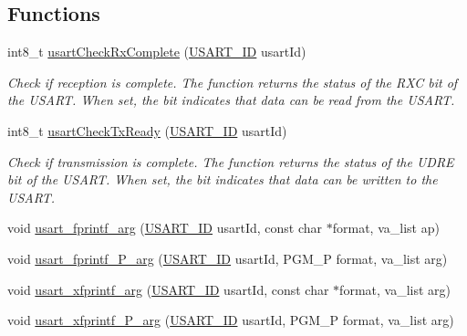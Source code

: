 \subsection*{Functions}
\begin{DoxyCompactItemize}
\item 
int8\+\_\+t \hyperlink{group__usart_async_module_ga590146f26805ddb1810fe874188aa10d}{usart\+Check\+Rx\+Complete} (\hyperlink{group__usart_async_module_gaae3c5ea77a411e5f40e4377f77067b86}{U\+S\+A\+R\+T\+\_\+\+ID} usart\+Id)
\begin{DoxyCompactList}\small\item\em Check if reception is complete. The function returns the status of the R\+XC bit of the U\+S\+A\+RT. When set, the bit indicates that data can be read from the U\+S\+A\+RT. \end{DoxyCompactList}\item 
int8\+\_\+t \hyperlink{group__usart_async_module_gaaab3f24aac455dad2295e72f6dff7bb5}{usart\+Check\+Tx\+Ready} (\hyperlink{group__usart_async_module_gaae3c5ea77a411e5f40e4377f77067b86}{U\+S\+A\+R\+T\+\_\+\+ID} usart\+Id)
\begin{DoxyCompactList}\small\item\em Check if transmission is complete. The function returns the status of the U\+D\+RE bit of the U\+S\+A\+RT. When set, the bit indicates that data can be written to the U\+S\+A\+RT. \end{DoxyCompactList}\item 
void \hyperlink{group__usart_async_module_gad3cf1cbb614711dcb8b73f7b7066cc24}{usart\+\_\+fprintf\+\_\+arg} (\hyperlink{group__usart_async_module_gaae3c5ea77a411e5f40e4377f77067b86}{U\+S\+A\+R\+T\+\_\+\+ID} usart\+Id, const char $\ast$format, va\+\_\+list ap)
\item 
void \hyperlink{group__usart_async_module_ga8b9e6d432ec75ce20fd8225d02cd8340}{usart\+\_\+fprintf\+\_\+\+P\+\_\+arg} (\hyperlink{group__usart_async_module_gaae3c5ea77a411e5f40e4377f77067b86}{U\+S\+A\+R\+T\+\_\+\+ID} usart\+Id, P\+G\+M\+\_\+P format, va\+\_\+list arg)
\item 
void \hyperlink{group__usart_async_module_ga7f6efaab6a3c0a43d34bcce2f45a9062}{usart\+\_\+xfprintf\+\_\+arg} (\hyperlink{group__usart_async_module_gaae3c5ea77a411e5f40e4377f77067b86}{U\+S\+A\+R\+T\+\_\+\+ID} usart\+Id, const char $\ast$format, va\+\_\+list arg)
\item 
void \hyperlink{group__usart_async_module_ga33e17cf0120f57e061a736a8eeb93fce}{usart\+\_\+xfprintf\+\_\+\+P\+\_\+arg} (\hyperlink{group__usart_async_module_gaae3c5ea77a411e5f40e4377f77067b86}{U\+S\+A\+R\+T\+\_\+\+ID} usart\+Id, P\+G\+M\+\_\+P format, va\+\_\+list arg)

\end{DoxyCompactItemize}
